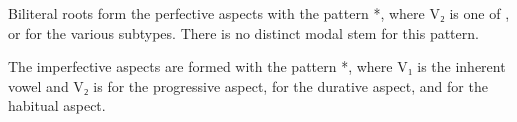 \documentclass[grammar]{subfiles}
\begin{document}
Biliteral roots form the perfective aspects with the pattern *,
where V₂ is one of ,  or  for the various subtypes.  There is
no distinct modal stem for this pattern.

The imperfective aspects are formed with the pattern *, where V₁
is the inherent vowel and V₂ is  for the progressive aspect,  for
the durative aspect, and  for the habitual aspect.  



\end{document}
